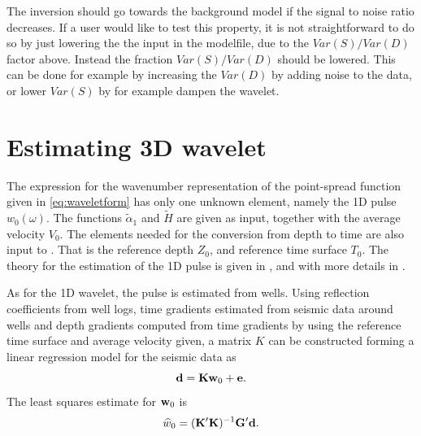 The inversion should go towards the background model if the signal to noise ratio decreases. If a user would like to test this property, it is not straightforward to do so by just lowering the the  input in the modelfile, due to the $Var(S)/Var(D)$ factor above. Instead the fraction $Var(S)/Var(D)$ should be lowered. This can be done for example by increasing the $Var(D)$ by adding noise to the data, or lower $Var(S)$ by for example dampen the wavelet.

\section{Estimating 3D wavelet}
\label{sec:3Dwaveestimp}
The expression for the wavenumber representation of the point-spread function given in \autoref{eq:waveletform}
has only one unknown element, namely the 1D pulse $w_0(\omega)$. The functions $\tilde{\alpha}_1$ and $\tilde{H}$ are given as input, together with the average velocity $V_0$. The elements needed for the conversion from depth to time are also input to \crava. That is the reference depth $Z_0$, and reference time surface $T_0$. The theory for the estimation of the 1D pulse is given in \cite{georgsen10}, and with more details in \cite{sand1010}.

As for the 1D wavelet, the pulse is estimated from wells. Using
reflection coefficients from well logs, time gradients estimated from
seismic data around wells and depth gradients computed from time
gradients by using the reference time surface and average velocity given, a matrix $K$ can be constructed forming a linear regression model for the seismic
data as
\begin{equation}
\mathbf{d} = \mathbf{K}\mathbf{w}_0 + \mathbf{e}.
\end{equation}
The least squares estimate for $\mathbf{w}_0$ is
\begin{equation}
\widehat{w}_0 = (\mathbf{K}'\mathbf{K})^{-1}\mathbf{G}'\mathbf{d}.
\end{equation}

